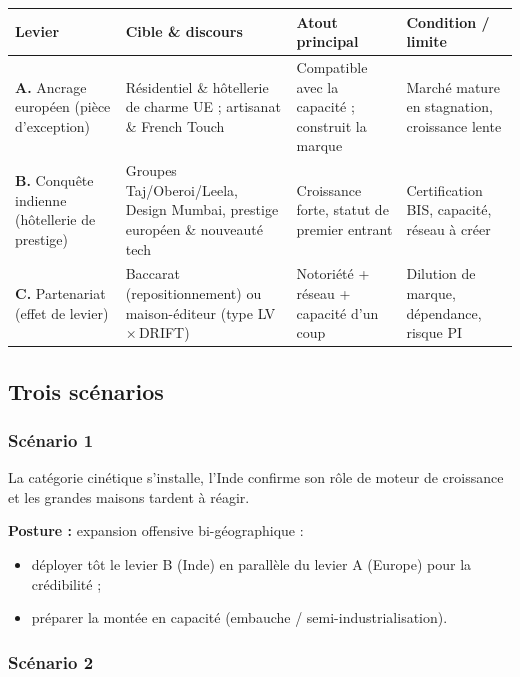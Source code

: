 \documentclass[11pt,a4paper]{article}
\begin{document}
\begin{center}
\begin{tabularx}{\linewidth}{L{4.0cm} L{4.2cm} L{4.0cm} X}
\toprule
\textbf{Levier} & \textbf{Cible \& discours} & \textbf{Atout principal} & \textbf{Condition / limite} \\
\midrule
\textbf{A.} Ancrage européen (pièce d'exception) &
  Résidentiel \& hôtellerie de charme UE ; artisanat \& French Touch &
  Compatible avec la capacité ; construit la marque &
  Marché mature en stagnation, croissance lente \\
\addlinespace
\textbf{B.} Conquête indienne (hôtellerie de prestige) &
  Groupes Taj/Oberoi/Leela, Design Mumbai, prestige européen \& nouveauté tech &
  Croissance forte, statut de premier entrant &
  Certification BIS, capacité, réseau à créer \\
\addlinespace
\textbf{C.} Partenariat (effet de levier) &
  Baccarat (repositionnement) ou maison-éditeur (type LV\,×\,DRIFT) &
  Notoriété + réseau + capacité d'un coup &
  Dilution de marque, dépendance, risque PI \\
\bottomrule
\end{tabularx}
\end{center}

\subsection{Trois scénarios}

\subsubsection*{Scénario 1}

La catégorie cinétique s'installe, l'Inde confirme son rôle de moteur de croissance et les grandes maisons tardent à réagir.

\textbf{Posture :} expansion offensive bi-géographique :
\begin{itemize}
  \item déployer tôt le levier B (Inde) en parallèle du levier A (Europe) pour la crédibilité ;
  \item préparer la montée en capacité (embauche / semi-industrialisation).
\end{itemize}

\subsubsection*{Scénario 2}
\end{document}
